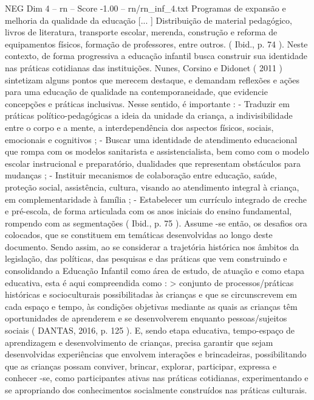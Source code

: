 \begin{textsample}{NEG Dim 4 – rn – Score -1.00 – rn/rn\_inf\_4.txt}
Programas de expansão e melhoria da qualidade da educação [... ] Distribuição de material pedagógico, livros de literatura, transporte escolar, merenda, construção e reforma de equipamentos físicos, formação de professores, entre outros. ( Ibid., p. 74 ).
Neste contexto, de forma progressiva a educação infantil busca construir sua identidade nas práticas cotidianas das instituições.
Nunes, Corsino e Didonet ( 2011 ) sintetizam alguns pontos que merecem destaque, e demandam reflexões e ações para uma educação de qualidade na contemporaneidade, que evidencie concepções e práticas inclusivas.
Nesse sentido, é importante : - Traduzir em práticas político-pedagógicas a ideia da unidade da criança, a indivisibilidade entre o corpo e a mente, a interdependência dos aspectos físicos, sociais, emocionais e cognitivos ; - Buscar uma identidade de atendimento educacional que rompa com os modelos sanitarista e assistencialista, bem como com o modelo escolar instrucional e preparatório, dualidades que representam obstáculos para mudanças ; - Instituir mecanismos de colaboração entre educação, saúde, proteção social, assistência, cultura, visando ao atendimento integral à criança, em complementaridade à família ; - Estabelecer um currículo integrado de creche e pré-escola, de forma articulada com os anos iniciais do ensino fundamental, rompendo com as segmentações ( Ibid., p. 75 ).
Assume -se então, os desafios ora colocados, que se constituem em temáticas desenvolvidas ao longo deste documento.
Sendo assim, ao se considerar a trajetória histórica nos âmbitos da legislação, das políticas, das pesquisas e das práticas que vem construindo e consolidando a Educação Infantil como área de estudo, de atuação e como etapa educativa, esta é aqui compreendida como : > conjunto de processos/práticas históricas e socioculturais possibilitadas às crianças e que se circunscrevem em cada espaço e tempo, às condições objetivas mediante as quais as crianças têm oportunidades de aprenderem e se desenvolverem enquanto pessoas/sujeitos sociais ( DANTAS, 2016, p. 125 ).
E, sendo etapa educativa, tempo-espaço de aprendizagem e desenvolvimento de crianças, precisa garantir que sejam desenvolvidas experiências que envolvem interações e brincadeiras, possibilitando que as crianças possam conviver, brincar, explorar, participar, expressa e conhecer -se, como participantes ativas nas práticas cotidianas, experimentando e se apropriando dos conhecimentos socialmente construídos nas práticas culturais.

\end{textsample}
